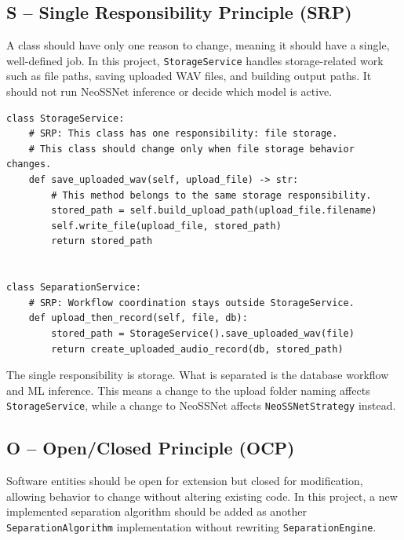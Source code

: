 \subsection{S -- Single Responsibility Principle (SRP)}

A class should have only one reason to change, meaning it should have a single, well-defined job. In this project, \texttt{StorageService} handles storage-related work such as file paths, saving uploaded WAV files, and building output paths. It should not run NeoSSNet inference or decide which model is active.

\begin{lstlisting}[caption={SRP Example: Storage Responsibility Only}]
class StorageService:
    # SRP: This class has one responsibility: file storage.
    # This class should change only when file storage behavior changes.
    def save_uploaded_wav(self, upload_file) -> str:
        # This method belongs to the same storage responsibility.
        stored_path = self.build_upload_path(upload_file.filename)
        self.write_file(upload_file, stored_path)
        return stored_path


class SeparationService:
    # SRP: Workflow coordination stays outside StorageService.
    def upload_then_record(self, file, db):
        stored_path = StorageService().save_uploaded_wav(file)
        return create_uploaded_audio_record(db, stored_path)
\end{lstlisting}

The single responsibility is storage. What is separated is the database workflow and ML inference. This means a change to the upload folder naming affects \texttt{StorageService}, while a change to NeoSSNet affects \texttt{NeoSSNetStrategy} instead.

\subsection{O -- Open/Closed Principle (OCP)}

Software entities should be open for extension but closed for modification, allowing behavior to change without altering existing code. In this project, a new implemented separation algorithm should be added as another \texttt{SeparationAlgorithm} implementation without rewriting \texttt{SeparationEngine}.

